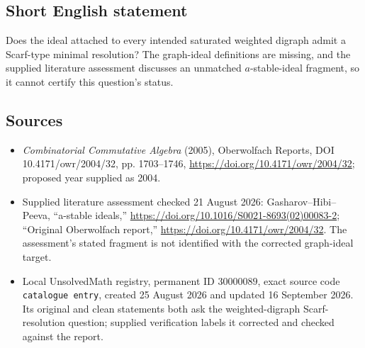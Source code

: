 \documentclass[11pt]{article}
\begin{document}
\subsection{Short English statement}
Does the ideal attached to every intended saturated weighted digraph admit a Scarf-type minimal resolution? The graph-ideal definitions are missing, and the supplied literature assessment discusses an unmatched $a$-stable-ideal fragment, so it cannot certify this question's status.
\subsection{Sources}
\begin{itemize}
\item \emph{Combinatorial Commutative Algebra} (2005), Oberwolfach Reports, DOI 10.4171/owr/2004/32, pp. 1703--1746, \url{https://doi.org/10.4171/owr/2004/32}; proposed year supplied as 2004.
\item Supplied literature assessment checked 21 August 2026: Gasharov--Hibi--Peeva, ``a-stable ideals,'' \url{https://doi.org/10.1016/S0021-8693(02)00083-2}; ``Original Oberwolfach report,'' \url{https://doi.org/10.4171/owr/2004/32}. The assessment's stated fragment is not identified with the corrected graph-ideal target.
\item Local UnsolvedMath registry, permanent ID $30000089$, exact source code \texttt{catalogue entry}, created 25 August 2026 and updated 16 September 2026. Its original and clean statements both ask the weighted-digraph Scarf-resolution question; supplied verification labels it corrected and checked against the report.
\end{itemize}
\end{document}
